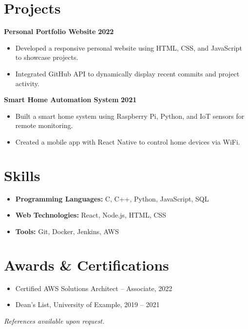 \documentclass[a4paper,10pt]{article}
\begin{document}
\section*{Projects}
\noindent\textbf{Personal Portfolio Website} \hfill \textbf{2022} \\
\begin{itemize}[leftmargin=*]
    \item Developed a responsive personal website using HTML, CSS, and JavaScript to showcase projects.
    \item Integrated GitHub API to dynamically display recent commits and project activity.
\end{itemize}

\noindent\textbf{Smart Home Automation System} \hfill \textbf{2021} \\
\begin{itemize}[leftmargin=*]
    \item Built a smart home system using Raspberry Pi, Python, and IoT sensors for remote monitoring.
    \item Created a mobile app with React Native to control home devices via WiFi.
\end{itemize}

\section*{Skills}
\begin{itemize}[leftmargin=*]
    \item \textbf{Programming Languages:} C, C++, Python, JavaScript, SQL
    \item \textbf{Web Technologies:} React, Node.js, HTML, CSS
    \item \textbf{Tools:} Git, Docker, Jenkins, AWS
\end{itemize}

\section*{Awards \& Certifications}
\begin{itemize}[leftmargin=*]
    \item Certified AWS Solutions Architect -- Associate, 2022
    \item Dean's List, University of Example, 2019 -- 2021
\end{itemize}

\begin{center}
    \vspace{20pt}
    \small{\textit{References available upon request.}}
\end{center}
\end{document}
